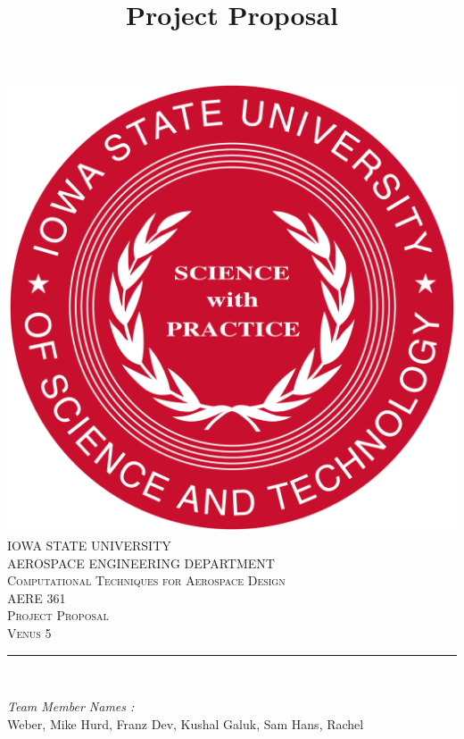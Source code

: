 \documentclass[12pt]{article}
\begin{document}
\title{Project Proposal}

\begin{titlepage}
	\centering
    \vspace*{0.5 cm}
    \includegraphics[scale = 0.11]{isu_seal.png}\\[1.0 cm]	%
    \textsc{\LARGE IOWA STATE UNIVERSITY}\\[2.0 cm]
    \textsc{\large AEROSPACE ENGINEERING DEPARTMENT}\\[0.2 cm]
    \textsc{\large Computational Techniques for Aerospace Design}\\[0.2 cm]
	\textsc{\Large AERE 361}\\[0.5 cm]				%
	\textsc{\Large Project Proposal}\\[0.2 cm]
	\textsc{\Large Venus 5}\\[0.2 cm]
	\rule{\linewidth}{0.2 mm} \\[0.4 cm]
	
	
	\begin{minipage}{0.8\textwidth}
		
			\begin{flushleft} 
			\emph{Team Member Names :} \\
			Weber, Mike\linebreak
			Hurd, Franz\linebreak
			Dev, Kushal\linebreak
			Galuk, Sam\linebreak
			Hans, Rachel\linebreak
			
		\end{flushleft}
	\end{minipage}\\[2 cm]
	
	\vfill
	
\end{titlepage}
\end{document}
